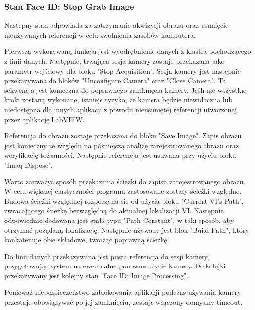 \documentclass{report}
\begin{document}
%

\subsubsection{\large Stan Face ID: Stop Grab Image}

Następny stan odpowiada za zatrzymanie akwizycji obrazu oraz usunięcie nieużywanych referencji w celu zwolnienia zasobów komputera.

Pierwszą wykonywaną funkcją jest wyodrębnienie danych z klastra pochodzącego z linii danych. Następnie, trwająca sesja kamery zostaje przekazana jako parametr wejściowy dla bloku "Stop Acquisition". Sesja kamery jest następnie przekazywana do bloków "Unconfigure Camera" oraz "Close Camera". Ta sekwencja jest konieczna do poprawnego zamknięcia kamery. Jeśli nie wszystkie kroki zostaną wykonane, istnieje ryzyko, że kamera będzie niewidoczna lub niedostępna dla innych aplikacji z powodu nieusuniętej referencji utworzonej przez aplikację LabVIEW.

Referencja do obrazu zostaje przekazana do bloku "Save Image". Zapis obrazu jest konieczny ze względu na późniejszą analizę zarejestrowanego obrazu oraz weryfikację tożsamości. Następnie referencja jest usuwana przy użyciu bloku "Imaq Dispose".

Warto zauważyć sposób przekazania ścieżki do zapisu zarejestrowanego obrazu. W celu większej elastyczności programu zastosowane zostały ścieżki względne. Budowa ścieżki względnej rozpoczyna się od użycia bloku "Current VI's Path", zwracającego ścieżkę bezwzględną do aktualnej lokalizacji VI. Następnie odpowiednio dodawana jest stała typu "Path Constant", w taki sposób, aby otrzymać pożądaną lokalizację. Następnie używany jest blok "Build Path", który konkatenuje obie składowe, tworząc poprawną ścieżkę.

Do linii danych przekazywana jest pusta referencja do sesji kamery, przygotowując system na ewentualne ponowne użycie kamery. Do kolejki przekazywany jest kolejny stan "Face ID: Image Processing".

Ponieważ niebezpieczeństwo zablokowania aplikacji podczas używania kamery przestaje obowiązywać po jej zamknięciu, zostaje włączony domyślny timeout.
\end{document}
